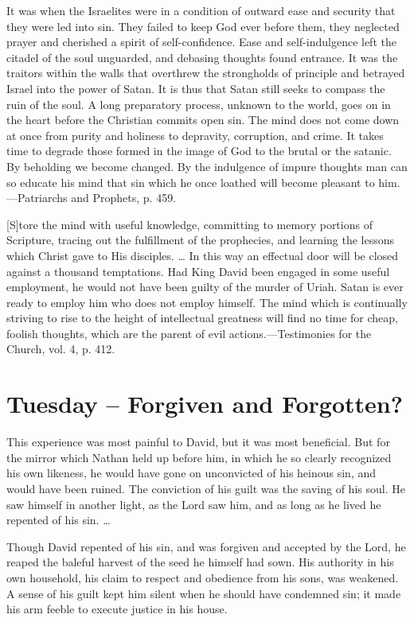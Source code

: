 \documentclass[a4paper, 10pt, twoside, headings=small]{scrartcl}
\begin{document}
\begin{multicols}{2}
It was when the Israelites were in a condition of outward ease and security that they were led into sin. They failed to keep God ever before them, they neglected prayer and cherished a spirit of self-confidence. Ease and self-indulgence left the citadel of the soul unguarded, and debasing thoughts found entrance. It was the traitors within the walls that overthrew the strongholds of principle and betrayed Israel into the power of Satan. It is thus that Satan still seeks to compass the ruin of the soul. A long preparatory process, unknown to the world, goes on in the heart before the Christian commits open sin. The mind does not come down at once from purity and holiness to depravity, corruption, and crime. It takes time to degrade those formed in the image of God to the brutal or the satanic. By beholding we become changed. By the indulgence of impure thoughts man can so educate his mind that sin which he once loathed will become pleasant to him.—Patriarchs and Prophets, p. 459.

[S]tore the mind with useful knowledge, committing to memory portions of Scripture, tracing out the fulfillment of the prophecies, and learning the lessons which Christ gave to His disciples. … In this way an effectual door will be closed against a thousand temptations. Had King David been engaged in some useful employment, he would not have been guilty of the murder of Uriah. Satan is ever ready to employ him who does not employ himself. The mind which is continually striving to rise to the height of intellectual greatness will find no time for cheap, foolish thoughts, which are the parent of evil actions.—Testimonies for the Church, vol. 4, p. 412.

\section*{Tuesday – Forgiven and Forgotten?}

This experience was most painful to David, but it was most beneficial. But for the mirror which Nathan held up before him, in which he so clearly recognized his own likeness, he would have gone on unconvicted of his heinous sin, and would have been ruined. The conviction of his guilt was the saving of his soul. He saw himself in another light, as the Lord saw him, and as long as he lived he repented of his sin. …

Though David repented of his sin, and was forgiven and accepted by the Lord, he reaped the baleful harvest of the seed he himself had sown. His authority in his own household, his claim to respect and obedience from his sons, was weakened. A sense of his guilt kept him silent when he should have condemned sin; it made his arm feeble to execute justice in his house.


\end{multicols}
\end{document}
